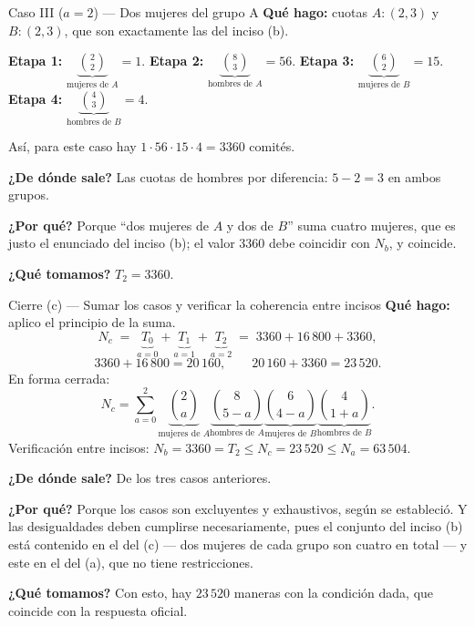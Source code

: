 \documentclass[11pt]{article}
\begin{document}
\begin{paso}{Caso III ($a=2$) --- Dos mujeres del grupo A}
\textbf{Qu\'e hago:} cuotas $A:(2,3)$ y $B:(2,3)$, que son exactamente las del inciso (b).

\medskip
\textbf{Etapa 1:} $\displaystyle \underbrace{\binom{2}{2}}_{\text{mujeres de }A}=1$.\quad
\textbf{Etapa 2:} $\displaystyle \underbrace{\binom{8}{3}}_{\text{hombres de }A}=56$.\quad
\textbf{Etapa 3:} $\displaystyle \underbrace{\binom{6}{2}}_{\text{mujeres de }B}=15$.\quad
\textbf{Etapa 4:} $\displaystyle \underbrace{\binom{4}{3}}_{\text{hombres de }B}=4$.

\medskip
As\'i, para este caso hay $1\cdot 56\cdot 15\cdot 4=3360$ comit\'es.

\textbf{¿De d\'onde sale?} Las cuotas de hombres por diferencia: $5-2=3$ en ambos grupos.

\textbf{¿Por qu\'e?} Porque ``dos mujeres de $A$ y dos de $B$'' suma cuatro mujeres, que es justo el enunciado
del inciso (b); el valor $3360$ debe coincidir con $N_b$, y coincide.

\textbf{¿Qu\'e tomamos?} $T_2=3360$.
\end{paso}

\begin{paso}{Cierre (c) --- Sumar los casos y verificar la coherencia entre incisos}
\textbf{Qu\'e hago:} aplico el principio de la suma.
\[
N_c\;=\;\underbrace{T_0}_{a=0}+\underbrace{T_1}_{a=1}+\underbrace{T_2}_{a=2}\;=\;3360+16\,800+3360 ,
\]
\[
3360+16\,800=20\,160,\qquad 20\,160+3360=23\,520 .
\]
En forma cerrada:
\[
N_c=\sum_{a=0}^{2}\underbrace{\binom{2}{a}}_{\text{mujeres de }A}\underbrace{\binom{8}{5-a}}_{\text{hombres de }A}\underbrace{\binom{6}{4-a}}_{\text{mujeres de }B}\underbrace{\binom{4}{1+a}}_{\text{hombres de }B} .
\]
Verificaci\'on entre incisos: $N_b=3360=T_2\le N_c=23\,520\le N_a=63\,504$.

\textbf{¿De d\'onde sale?} De los tres casos anteriores.

\textbf{¿Por qu\'e?} Porque los casos son excluyentes y exhaustivos, seg\'un se estableci\'o. Y las
desigualdades deben cumplirse necesariamente, pues el conjunto del inciso (b) est\'a contenido en el del
(c) --- dos mujeres de cada grupo son cuatro en total --- y este en el del (a), que no tiene restricciones.

\textbf{¿Qu\'e tomamos?} Con esto, hay $23\,520$ maneras con la condici\'on dada, que coincide con la
respuesta oficial.
\end{paso}
\end{document}
